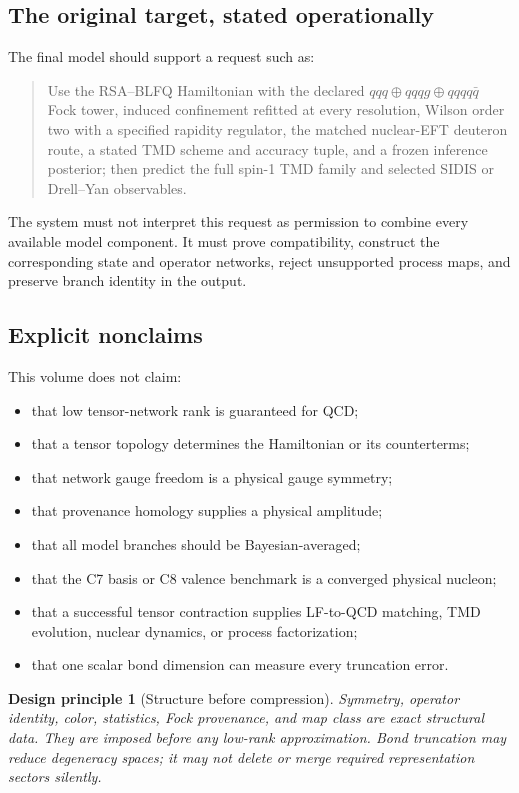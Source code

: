 \documentclass[11pt]{article}
\newtheorem{principle}[definition]{Design principle}
\begin{document}
\subsection{The original target, stated operationally}

The final model should support a request such as:
\begin{quote}
Use the RSA--BLFQ Hamiltonian with the declared \(qqq\oplus qqqg\oplus
qqqq\bar q\) Fock tower, induced confinement refitted at every resolution,
Wilson order two with a specified rapidity regulator, the matched nuclear-EFT
deuteron route, a stated TMD scheme and accuracy tuple, and a frozen inference
posterior; then predict the full spin-1 TMD family and selected SIDIS or
Drell--Yan observables.
\end{quote}
The system must not interpret this request as permission to combine every
available model component.  It must prove compatibility, construct the
corresponding state and operator networks, reject unsupported process maps,
and preserve branch identity in the output.

\subsection{Explicit nonclaims}

This volume does not claim:
\begin{itemize}
 \item that low tensor-network rank is guaranteed for QCD;
 \item that a tensor topology determines the Hamiltonian or its counterterms;
 \item that network gauge freedom is a physical gauge symmetry;
 \item that provenance homology supplies a physical amplitude;
 \item that all model branches should be Bayesian-averaged;
 \item that the C7 basis or C8 valence benchmark is a converged physical
 nucleon;
 \item that a successful tensor contraction supplies LF-to-QCD matching,
 TMD evolution, nuclear dynamics, or process factorization;
 \item that one scalar bond dimension can measure every truncation error.
\end{itemize}

\begin{principle}[Structure before compression]
Symmetry, operator identity, color, statistics, Fock provenance, and map class
are exact structural data.  They are imposed before any low-rank approximation.
Bond truncation may reduce degeneracy spaces; it may not delete or merge
required representation sectors silently.
\end{principle}
\end{document}
